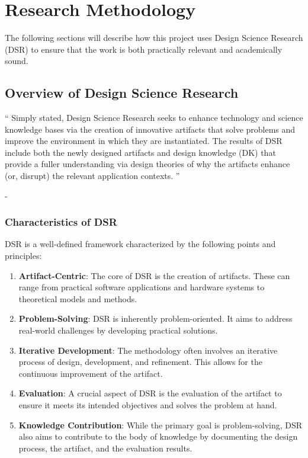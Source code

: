 \chapter{Research Methodology}

The following sections will describe how this project uses 
Design Science Research (DSR) to ensure that the work is both practically 
relevant and academically sound.

\label{Chapter3}
\section{Overview of Design Science Research}

\enquote{
Simply stated, Design Science Research seeks to enhance
technology and science knowledge bases via the creation of innovative artifacts that solve
problems and improve the environment in which they are instantiated. The results of DSR include
both the newly designed artifacts and design knowledge (DK) that provide a fuller understanding
via design theories of why the artifacts enhance (or, disrupt) the relevant application contexts.
}  

  
- \cite{DesignScienceHevner}

\subsection{Characteristics of DSR}

DSR is a well-defined framework characterized by the following points and principles:

\begin{enumerate}
    \item \textbf{Artifact-Centric}: The core of DSR is the creation of artifacts. These can range from practical software applications and hardware systems to theoretical models and methods.
    \item \textbf{Problem-Solving}: DSR is inherently problem-oriented. It aims to address real-world challenges by developing practical solutions.
    \item \textbf{Iterative Development}: The methodology often involves an iterative process of design, development, and refinement. This allows for the continuous improvement of the artifact.
    \item \textbf{Evaluation}: A crucial aspect of DSR is the evaluation of the artifact to ensure it meets its intended objectives and solves the problem at hand.
    \item \textbf{Knowledge Contribution}: While the primary goal is problem-solving, DSR also aims to contribute to the body of knowledge by documenting the design process, the artifact, and the evaluation results.
\end{enumerate}

